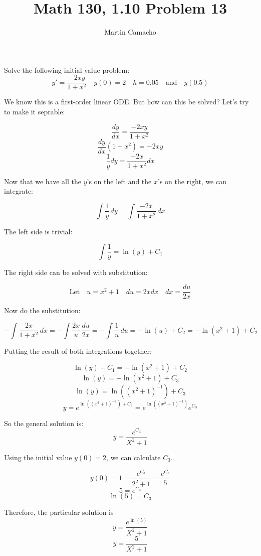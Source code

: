 \documentclass{article}
\begin{document}
\title{Math 130, 1.10 Problem 13}

\author{Martin Camacho}
\maketitle

Solve the following initial value problem:
\[ 
  y' = \frac{-2xy}{1 + x^2} \quad
  y(0) = 2  \quad h = 0.05 \quad \textrm{and} \quad y(0.5)
\]

We know this is a first-order linear ODE. But how can this be solved? 
Let's try to make it seprable:

\[ \frac{dy}{dx} = \frac{-2xy}{1 + x^2} \]
\[ \frac{dy}{dx}(1 + x^2) = -2xy \]
\[ \frac{1}{y}dy = \frac{-2x}{1 + x^2}dx \]

Now that we have all the \(y\)'s on the left and the \(x\)'s on the right, we can integrate:

\[ \int \frac{1}{y} \,dy = \int \frac{-2x}{1 + x^2} \,dx \]

The left side is trivial:

\[ \int \frac{1}{y} = \ln(y) + C_1\]

The right side can be solved with substitution:

\[\textrm{Let} \quad u = x^2 + 1 \quad du = 2xdx \quad dx = \frac{du}{2x}\]

Now do the substitution:

\[-\int \frac{2x}{1 + x^2} \,dx = -\int \frac{2x}{u} \,\frac{du}{2x} = -\int \frac{1}{u} \,du = -\ln(u) + C_2 = -\ln(x^2 + 1) + C_2\]

Putting the result of both integrations together:

\[ \ln(y) + C_1 = -\ln(x^2 + 1) + C_2\]
\[ \ln(y) = -\ln(x^2 + 1) + C_3\]
\[ \ln(y) = \ln((x^2 + 1)^{-1}) + C_3\]
\[ y = e^{\ln((x^2 + 1)^{-1}) + C_3} = e^{\ln((x^2 + 1)^{-1})}e^{C_3}\]

So the general solution is:
\[ y = \frac{e^{C_3}}{X^2 + 1}\]

Using the initial value  \(y(0) = 2\), we can calculate  \(C_3\).

\[ y(0) = 1 = \frac{e^{C_3}}{2^2 + 1} = \frac{e^{C_3}}{5}\]
\[ 5 = e^{C_3}\]
\[ \ln(5) = C_3\]

Therefore, the particular solution is
\[ y = \frac{e^{\ln(5)}}{X^2 + 1}\]
\[ y = \frac{5}{X^2 + 1}\]
\end{document}
